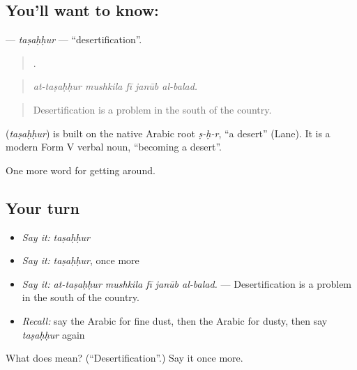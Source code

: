 \subsection*{You'll want to know: }
\textbf{} — \emph{taṣaḥḥur} — \textquotedblleft{}desertification\textquotedblright{}.

\begin{quote}
    .
\end{quote}

\begin{quote}
\emph{at-taṣaḥḥur mushkila fī janūb al-balad.}
\end{quote}

\begin{quote}
Desertification is a problem in the south of the country.
\end{quote}

\begin{cousinweb}
\textbf{} (\emph{taṣaḥḥur}) is built on the native Arabic root \emph{ṣ-ḥ-r}, \textquotedblleft{}a desert\textquotedblright{} (Lane). It is a modern Form V verbal noun, \textquotedblleft{}becoming a desert\textquotedblright{}.
\end{cousinweb}

\begin{grammarlens}[title={What you've built}]
One more word for getting around.
\end{grammarlens}

\subsection*{Your turn}
\begin{itemize}
\raggedright
  \item \emph{Say it:} \emph{taṣaḥḥur}
  \item \emph{Say it:} \emph{taṣaḥḥur}, once more
  \item \emph{Say it:} \emph{at-taṣaḥḥur mushkila fī janūb al-balad.} — Desertification is a problem in the south of the country.
  \item \emph{Recall:} say the Arabic for fine dust, then the Arabic for dusty, then say \emph{taṣaḥḥur} again
\end{itemize}

\begin{tcolorbox}[breakable,colback=teal!4,colframe=teal!35!black,title={Before you move on}]
What does  mean? (\textquotedblleft{}Desertification\textquotedblright{}.) Say it once more.
\end{tcolorbox}
